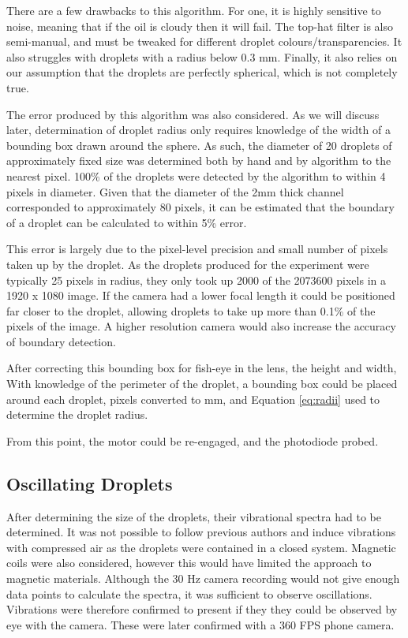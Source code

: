 \documentclass{physics_article_B}
\begin{document}
            There are a few drawbacks to this algorithm. For one, it is highly sensitive to noise, meaning that if the oil is cloudy then it will fail. The top-hat filter is also semi-manual, and must be tweaked for different droplet colours/transparencies. It also struggles with droplets with a radius below 0.3 mm. Finally, it also relies on our assumption that the droplets are perfectly spherical, which is not completely true.
            
            The error produced by this algorithm was also considered. As we will discuss later, determination of droplet radius only requires knowledge of the width of a bounding box drawn around the sphere. As such, the diameter of 20 droplets of approximately fixed size was determined both by hand and by algorithm to the nearest pixel. 100\% of the droplets were detected by the algorithm to within 4 pixels in diameter. Given that the diameter of the 2mm thick channel corresponded to approximately 80 pixels, it can be estimated that the boundary of a droplet can be calculated to within 5\% error. 
            
            This error is largely due to the pixel-level precision and small number of pixels taken up by the droplet. As the droplets produced for the experiment were typically 25 pixels in radius, they only took up 2000 of the 2073600 pixels in a 1920 x 1080 image. If the camera had a lower focal length it could be positioned far closer to the droplet, allowing droplets to take up more than 0.1\% of the pixels of the image. A higher resolution camera would also increase the accuracy of boundary detection. 
            
            After correcting this bounding box for fish-eye in the lens, the height and width, With knowledge of the perimeter of the droplet, a bounding box could be placed around each droplet, pixels converted to mm, and Equation \ref{eq:radii} used to determine the droplet radius.
            
            From this point, the motor could be re-engaged, and the photodiode probed.
    
    \subsection{Oscillating Droplets\label{sect:method:oscillating}}
        
        After determining the size of the droplets, their vibrational spectra had to be determined. It was not possible to follow previous authors and induce vibrations with compressed air as the droplets were contained in a closed system. Magnetic coils were also considered, however this would have limited the approach to magnetic materials. Although the 30 Hz camera recording would not give enough data points to calculate the spectra, it was sufficient to observe oscillations. Vibrations were therefore confirmed to present if they they could be observed by eye with the camera. These were later confirmed with a 360 FPS phone camera.
        
\end{document}
